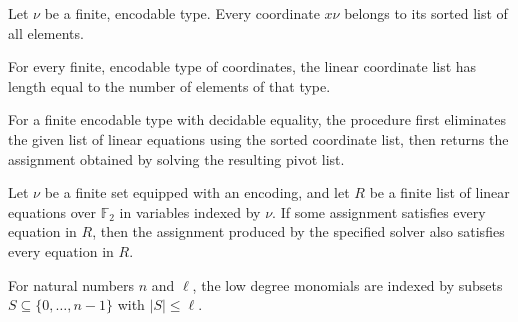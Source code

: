 \begin{theorem}
\leanok
{}
Let $\nu$ be a finite, encodable type. Every coordinate $x\nu$ belongs to its sorted
list of all elements.
\end{theorem}

\begin{theorem}
\leanok
{}
For every finite, encodable type of coordinates, the linear coordinate list has length
equal to the number of elements of that type.
\end{theorem}

\begin{definition}
\leanok
{}
For a finite encodable type with decidable equality, the procedure first eliminates the
given list of linear equations using the sorted coordinate list, then returns the
assignment obtained by solving the resulting pivot list.
\end{definition}

\begin{theorem}
\leanok
{}
Let $\nu$ be a finite set equipped with an encoding, and let $R$ be a finite list of
linear equations over $\mathbb F_2$ in variables indexed by $\nu$. If some assignment
satisfies every equation in $R$, then the assignment produced by the specified solver
also satisfies every equation in $R$.
\end{theorem}

\begin{definition}
\label{FABL.LowDegreeMonomial}
\leanok
For natural numbers $n$ and $\ell$, the low degree monomials are indexed by subsets
$S\subseteq\{0,\ldots,n-1\}$ with $|S|\leq\ell$.
\end{definition}

